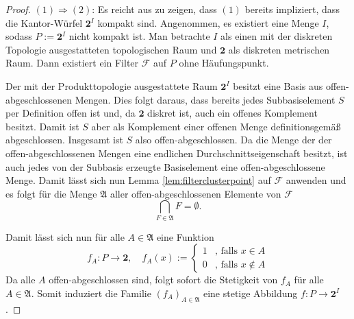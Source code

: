\begin{proof}
  $(1)\Rightarrow(2) $: Es reicht aus zu zeigen, dass $(1)$ bereits impliziert, dass die Kantor-Würfel $\mathbf{2}^I$ kompakt sind.
  Angenommen, es existiert eine Menge $I$, sodass $P:= \mathbf{2}^I$ nicht kompakt ist.
  Man betrachte $I$ als einen mit der diskreten Topologie ausgestatteten topologischen Raum und $\mathbf{2}$ als diskreten metrischen Raum.
  Dann existiert ein Filter $\mathcal{F}$ auf $P$ ohne Häufungspunkt.

  Der mit der Produkttopologie ausgestattete Raum $\mathbf{2}^I$ besitzt eine Basis aus offen-ab\-ge\-schlossenen Mengen.
  Dies folgt daraus, dass bereits jedes Subbasiselement $S$ per Definition offen ist und, da $\mathbf{2}$ diskret ist, auch ein offenes Komplement besitzt.
  Damit ist $S$ aber als Komplement einer offenen Menge definitionsgemäß abgeschlossen.
  Insgesamt ist $S$ also offen-abgeschlossen.
  Da die Menge der der offen-abgeschlossenen Mengen eine endlichen Durchschnittseigenschaft besitzt, ist auch jedes von der Subbasis erzeugte Basiselement eine offen-abgeschlossene Menge.
  Damit lässt sich nun Lemma \ref{lem:filterclusterpoint} auf $\mathcal{F}$ anwenden und es folgt für die Menge $\mathfrak{A}$ aller offen-abgeschlossenen Elemente von $\mathcal{F}$
  \begin{displaymath}
   \bigcap_{F \in \mathfrak{A}} F = \emptyset.
  \end{displaymath}

  Damit lässt sich nun für alle $A \in \mathfrak{A}$ eine Funktion
  \begin{displaymath}
    f_A \colon P \to \mathbf{2}, \quad
    f_A(x) := 
    \begin{cases}
      1 &\text{, falls } x \in A \\
      0 &\text{, falls } x \not\in A
    \end{cases}
  \end{displaymath}
  Da alle $A$ offen-abgeschlossen sind, folgt sofort die Stetigkeit von $f_A$ für alle $A \in \mathfrak{A}$.
  Somit induziert die Familie $(f_A)_{A \in \mathfrak{A}}$ eine stetige Abbildung $f \colon P \to \mathbf{2}^I$.

\end{proof}

